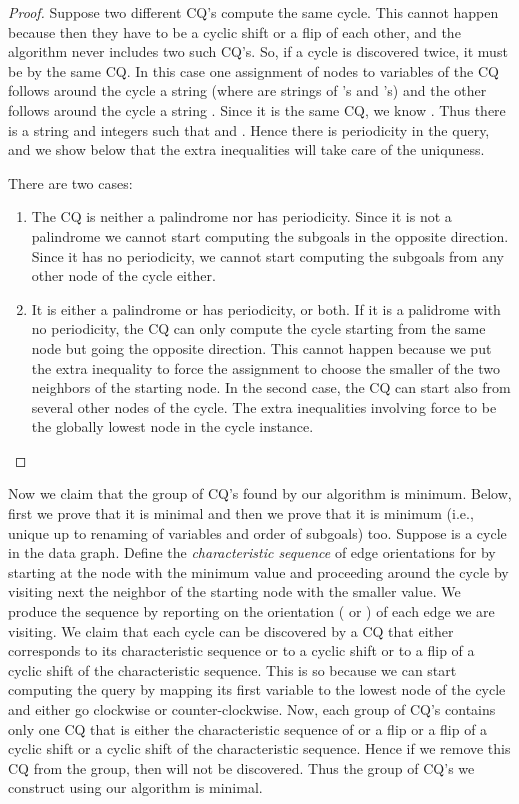 \begin{proof}
Suppose two different CQ's compute the same cycle. This cannot
happen because then they have to be a cyclic shift or a flip of each other,
and the algorithm never includes two such CQ's.
So, if a cycle is discovered twice, it must be by the same CQ.
In this case one assignment of nodes to variables of the CQ follows around the cycle a string   (where  are strings of 's and 's)
and the other follows around the cycle a string . Since it is the same CQ, we
know . Thus there is a string  and integers 
such that  and . Hence there is periodicity in the query, and we show below that the extra in\-equal\-i\-ties will take care of the uniquness.

There are two cases:

\begin{enumerate}

\item
The CQ is neither a palindrome nor has periodicity.
Since it is not a palindrome we cannot start computing the subgoals
in the opposite direction. Since it has no periodicity, we cannot
start computing the subgoals from any other node of the cycle either.

\item
It is either a palindrome or has periodicity, or both.
If it is a palidrome with no periodicity, the CQ can only compute the cycle starting from the same node but going the opposite direction. This cannot happen because
we put the extra inequality to force the assignment to choose the smaller
of the two neighbors of the starting node.
In the second case, the CQ can start also from several other nodes of
the cycle. The extra inequalities involving  force  to be the globally lowest node in the cycle instance.

\end{enumerate}
\end{proof}

Now we claim that the group of CQ's found by our algorithm is minimum.
Below, first we prove that it is minimal and then we prove that it is minimum (i.e., unique up to renaming of variables and order of subgoals) too.
Suppose  is a cycle in the data graph.  Define the {\em characteristic sequence} of edge orientations for  by starting at the node with the minimum
value and proceeding around the cycle by visiting next the neighbor of the starting node
with the smaller value. We produce the sequence by reporting
on the orientation ( or ) of each edge we are visiting. We claim that each cycle
can be discovered by a CQ that either corresponds to its characteristic sequence
or to a cyclic shift or to a flip of a cyclic shift of the characteristic sequence.
This is so because we can start computing the query by mapping its first variable
to the lowest node of the cycle and either go clockwise or counter-clockwise.
Now, each group of CQ's contains only one CQ that is either the characteristic sequence
of  or a flip or a flip of a cyclic shift or a cyclic shift of the characteristic sequence. Hence if we remove this CQ from the group, then  will not be
discovered. Thus the group of CQ's we construct using our algorithm is minimal.

